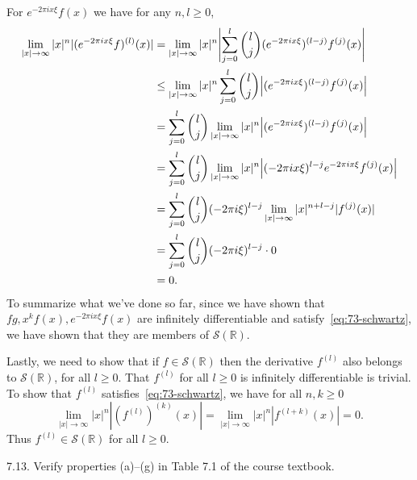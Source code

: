\documentclass{article}
\newcommand{\R}{\mathbb{R}}
\newcommand{\fS}{\mathcal{S}}
\begin{document}
For $e^{- 2 \pi i x \xi} f(x)$ we have for any $n, l \geq 0$,
%
\begin{align*}
    \lim_{|x| \to \infty} |x|^n |(e^{- 2 \pi i x \xi} f)^{(l)}(x)|
        &= \lim_{|x| \to \infty} |x|^n \envert[4]{\sum_{j = 0}^l \binom{l}{j} (e^{- 2 \pi i x \xi})^{(l - j)} f^{(j)}(x)} \\
        &\leq \lim_{|x| \to \infty} |x|^n \sum_{j = 0}^l \binom{l}{j} \envert{(e^{- 2 \pi i x \xi})^{(l - j)} f^{(j)}(x)} \\
        &= \sum_{j = 0}^l \binom{l}{j} \lim_{|x| \to \infty} |x|^n \envert{(e^{- 2 \pi i x \xi})^{(l - j)} f^{(j)}(x)} \\
        &= \sum_{j = 0}^l \binom{l}{j} \lim_{|x| \to \infty} |x|^n \envert{(- 2 \pi i x \xi)^{l - j} e^{- 2 \pi i x \xi} f^{(j)}(x)} \\
        &= \sum_{j = 0}^l \binom{l}{j} (- 2 \pi i \xi)^{l - j} \lim_{|x| \to \infty} |x|^{n + l - j} |f^{(j)}(x)| \\
        &= \sum_{j = 0}^l \binom{l}{j} (- 2 \pi i \xi)^{l - j} \cdot 0 \\
        &= 0
        .
\end{align*}
%
To summarize what we've done so far, since we have shown that
$fg, x^k f(x), e^{- 2 \pi i x \xi} f(x)$ are infinitely differentiable
and satisfy~\eqref{eq:73-schwartz}, we have shown that they are members
of $\fS(\R)$.

Lastly, we need to show that if $f \in \fS(\R)$ then the derivative
$f^{(l)}$ also belongs to $\fS(\R)$, for all $l \geq 0$. That $f^{(l)}$
for all $l \geq 0$ is infinitely differentiable is trivial. To show that
$f^{(l)}$ satisfies~\eqref{eq:73-schwartz}, we have for all
$n, k \geq 0$
%
\begin{equation*}
    \lim_{|x| \to \infty} |x|^n |(f^{(l)})^{(k)}(x)|
    = \lim_{|x| \to \infty} |x|^n |f^{(l + k)}(x)|
    = 0
    .
\end{equation*}
%
Thus $f^{(l)} \in \fS(\R)$ for all $l \geq 0$.


\newpage

7.13. Verify properties (a)--(g) in Table 7.1 of the course textbook.
\end{document}
